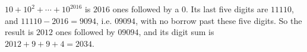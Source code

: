 $10+10^2+\cdots+10^{2016}$ is $2016$ ones followed by a $0$. Its last five digits are $11110$, and $11110-2016=9094$, i.e. $09094$, with no borrow past these five digits. So the result is $2012$ ones followed by $09094$, and its digit sum is $2012+9+9+4=\boxed{2034}$.
